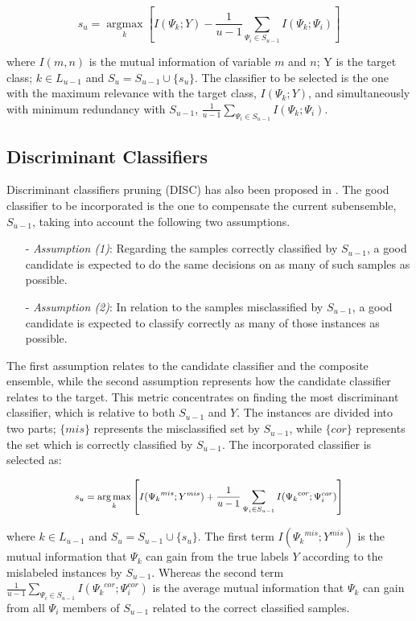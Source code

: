 \begin{equation}
\label{MRMR.eq}
s_u=\mathop{\arg\max}\limits_{k} \left[ I(\Psi_k;Y)  - \frac{1}{u-1} \mathop{\sum}\limits_{\Psi_i\in{S_{u-1}}}  I(\Psi_k;\Psi_i)  \right]
\end{equation}

\noindent where $I(m,n)$ is the mutual information of variable $m$ and $n$; Y is the target class; $k \in L_{u-1}$ and $S_u=S_{u-1} \cup \{s_u\}$. The classifier to be selected is the one with the maximum relevance with the target class,  $I(\Psi_k;Y)$, and simultaneously with minimum redundancy with $S_{u-1}$, $\frac{1}{u-1} \mathop{\sum}_{\Psi_i\in{S_{u-1}}}  I(\Psi_k;\Psi_i)$.  

\subsection{Discriminant Classifiers} \label{ch6_DISC}
Discriminant classifiers pruning (DISC) has also been proposed in \cite{cao2018}. The good classifier to be incorporated is the one to compensate the current subensemble, $S_{u-1}$, taking into account the following two assumptions.
\begin{itemize}[nosep]
    \item[-] \textit{Assumption (1)}: Regarding the samples correctly classified by $S_{u-1}$, a good candidate is expected to do the same decisions on as many of such samples as possible.
    \item[-] \textit{Assumption (2)}: In relation to the samples misclassified by $S_{u-1}$, a good candidate is expected to classify correctly as many of those instances as possible. 
\end{itemize}
The first assumption relates to the candidate classifier and the composite ensemble, while the second assumption represents how the candidate classifier relates to the target. This metric concentrates on finding the most discriminant classifier, which is relative to both $S_{u-1}$ and $Y$. The instances are divided into two parts; $\{mis\}$ represents the misclassified set by $S_{u-1}$, while $\{cor\}$ represents the set which is correctly classified by $S_{u-1}$. The incorporated classifier is selected as:         

\begin{equation}
\scalemath{0.87}{
\label{DISC.eq}
s_u=\mathop{\arg\max}\limits_{k} \left[ I({\Psi_k}^{mis};Y^{mis})  + \frac{1}{u-1} \mathop{\sum}\limits_{\Psi_i\in{S_{u-1}}}  I({\Psi_k}^{cor};\Psi_i^{cor})  \right]
}
\end{equation}

\noindent where $k \in L_{u-1}$ and $S_u=S_{u-1} \cup \{s_u\}$. The first term $I({\Psi_k}^{mis};Y^{mis})$ is the mutual information that $\Psi_k$ can gain from the true labels $Y$ according to the mislabeled instances by $S_{u-1}$. Whereas the second term $\frac{1}{u-1} \mathop{\sum}_{\Psi_i\in{S_{u-1}}}  I({\Psi_k}^{cor};\Psi_i^{cor})$ is the average mutual information that $\Psi_k$ can gain from all $\Psi_i$ members of $S_{u-1}$ related to the correct classified samples.  


